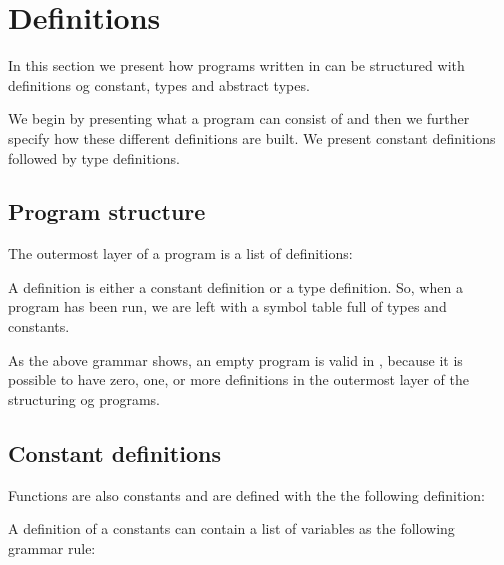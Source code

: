 \section{Definitions}
\label{sec:definitions}
In this section we present how programs written in \productname{} can be
structured with definitions og constant, types and abstract types.

We begin by presenting what a program can consist of and then we further specify
how these different definitions are built. We present constant definitions
followed by type definitions.

\subsection{Program structure}

The outermost layer of a \productname{} program is a list of definitions:

\begin{ebnf}
\end{ebnf}

A definition is either a constant definition or a type definition. So, when a
program has been run, we are left with a symbol table full of types and
constants.

As the above grammar shows, an empty program is valid in \productname{}, because
it is possible to have zero, one, or more definitions in the outermost layer of
the structuring og programs.

\subsection{Constant definitions}

Functions are also constants and are defined with the the following definition:

\begin{ebnf}
\end{ebnf}

A definition of a constants can contain a list of variables as the following
grammar rule:

\begin{ebnf}
\end{ebnf}

